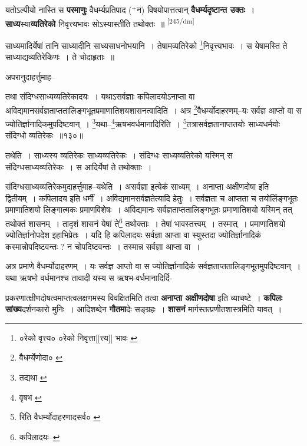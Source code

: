 \documentclass[article,12pt,a4paper]{memoir}
\newcommand{\add}[1]{($^{+}$#1)}
\begin{document}
	  \pstart यतोऽल्पीयो नास्ति स \textbf{परमाणुः} वैधर्म्यप्रतिपाद \add{न} विषयोपात्तत्वान् \textbf{वैधर्म्यदृष्टान्त उक्तः} । \textbf{साध्य}स्या\textbf{व्यतिरेको} निवृत्त्यभावः सोऽस्यास्तीति तथोक्तः ॥
	\pend
      \leavevmode\textsuperscript{\rmlatinfont\tiny [245/dm]}

	  \pstart साध्यमादिर्येषां तानि साध्यादीनि साध्यसाधनोभयानि । तेषामव्यतिरेको \footnote{०रेको वृत्त्य० \cite{dp-msA} \cite{dp-edP} \cite{dp-edH} \cite{dp-edN} ०रेको निवृत्ता[[त्त्य]] भावः \cite{dp-msB}}निवृत्त्यभावः । स येषामस्ति ते साध्याद्यव्यतिरेकिणः । ते चोदाहृताः ॥
	\pend
       

	  \pstart अपरानुदाहर्त्तुमाह--
	\pend
       

	  \pstart तथा संदिग्धसाध्यव्यतिरेकादयः । यथाऽसर्वज्ञाः कपिलादयोऽनाप्ता वा अविद्यमानसर्वज्ञताप्ततालिङ्गभूतप्रमाणातिशयशासनत्वादिति । अत्र \footnote{वैधर्म्येणोदा० \cite{dp-msC}}वैधर्म्योदाहरणम्--यः सर्वज्ञ आप्तो वा स ज्योतिर्ज्ञानादिकमुपदिष्टवान् । \footnote{तद्यथा \cite{dp-msB} \cite{dp-msD} \cite{dp-edP} \cite{dp-edH} \cite{dp-edE} \cite{dp-edN}}यथा--\footnote{वृषभ \cite{dp-msC}}ऋषभवर्धमानादिरिति । \footnote{रिति वैधर्म्योदाहरणादसर्व० \cite{dp-msC}}तत्रासर्वज्ञतानाप्ततयोः साध्यधर्मयोः संदिग्धो व्यतिरेकः ॥१३०॥
	\pend
       

	  \pstart तथेति । साध्यस्य व्यतिरेकः साध्यव्यतिरेकः । संदिग्धः साध्यव्यतिरेको यस्मिन् स संदिग्धसाध्यव्यतिरेकः । स आदिर्येषां ते तथोक्ताः ।
	\pend
       

	  \pstart संदिग्धसाध्यव्यतिरेकमुदाहर्त्तुमाह--यथेति । असर्वज्ञा इत्येकं साध्यम् । अनाप्ता अक्षीणदोषा इति द्वितीयम् । कपिलादय इति धर्मीं । अविद्यमानसर्वज्ञतेत्यादि हेतुः । सर्वज्ञता च आप्तता च तयोर्लिङ्गभूतः प्रमाणातिशयो लिङ्गात्मकः प्रमाणविशेषः । अविद्यमानः सर्वज्ञताप्ततालिङ्गभूतः प्रमाणातिशयो यस्मिन् तत् तथोक्तं शासनम् । तादृशं शासनं येषां ते\footnote{कपिलादयः--\cite{dp-msD-n}} तथोक्ताः । तेषां भावस्तत्त्वम् । तस्मात् । प्रमाणातिशयो ज्योतिर्ज्ञानोपदेश इहाभिप्रेतः । यदि हि कपिलादयः सर्वज्ञा आप्ता वा स्युस्तदा ज्योतिर्ज्ञानादिकं कस्मान्नोपदिष्टवन्तः ? न चोपदिष्टवन्तः । तस्मान्न सर्वज्ञा आप्ता वा ।
	\pend
       

	  \pstart अत्र प्रमाणे वैधर्म्योदाहरणम् । यः सर्वज्ञ आप्तो वा स ज्योतिर्ज्ञानादिकं सर्वज्ञताप्ततालिङ्गभूतमुपदिष्टवान् । यथा ऋषभो वर्धमानश्च तावादी यस्य स ऋषभ-वर्धमानादिर्दि-
	\pend
      

	  \pstart प्रकरणात्क्षीणदोषत्वमाप्तत्वलक्षणमस्य विवक्षितमिति तत्वा \textbf{अनाप्ता अक्षीणदोषा} इति व्याचष्टे । \textbf{कपिलः सांख्य}दर्शनकारो मुनिः । आदिशब्देन \textbf{गौतमा}देः सङ्ग्रहः । \textbf{शासनं} मार्गस्तत्प्रणीतशास्त्रमिति यावत् ।
	\pend
      
\end{document}

